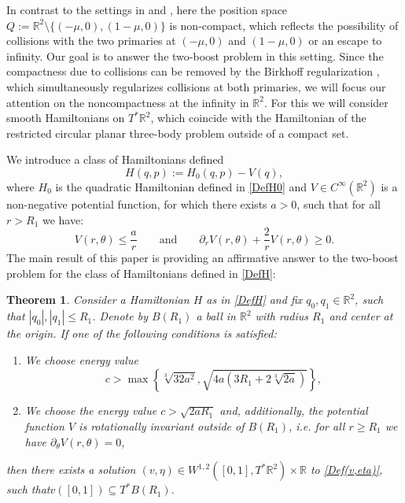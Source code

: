 \documentclass[a4paper]{amsart}
\newtheorem{thm}{Theorem}[section]
\numberwithin{equation}{section}
\newcommand{\R}{\mathbb{R}}
\begin{document}
In contrast to the settings in \cite{CieliebakFrauenfelder2009} and \cite{Merry2014}, here the position space\linebreak $Q:=\R^2\setminus\{(-\mu, 0), (1-\mu,0)\}$ is non-compact, which reflects the possibility of collisions with the two primaries at $(-\mu, 0)$ and $(1-\mu,0)$ or an escape to infinity. Our goal is to answer the two-boost problem in this setting. Since the compactness due to collisions can be removed by the Birkhoff regularization \cite{Birkhoff1915}, which simultaneously regularizes collisions at both primaries, we will focus our attention on the noncompactness at the infinity in $\R^2$. For this we will consider smooth Hamiltonians on $T^*\R^2$, which coincide with the Hamiltonian of the restricted circular planar three-body problem outside of a compact set. 

We introduce a class of Hamiltonians defined
\begin{equation}\label{DefH}
H(q,p):= H_0(q,p) - V(q),
\end{equation}
where $H_0$ is the quadratic Hamiltonian defined in \eqref{DefH0} and $V\in C^\infty(\R^2)$ is a non-negative potential function, for which there exists $a>0$, such that for all $r>R_1$ we have:
\begin{equation}\label{DefV}
V(r, \theta) \leq \frac{a}{r}\qquad\textrm{and}\qquad \partial_r V(r,\theta) +\frac{2}{r}V(r,\theta)\geq 0.
\end{equation}
The main result of this paper is providing an affirmative answer to the two-boost problem for the class of Hamiltonians defined in \eqref{DefH}:


\begin{thm} \label{thm:ExistenceOfChords}
Consider a Hamiltonian $H$ as in \eqref{DefH} and fix $q_0,q_1 \in \R^2$, such that $|q_0|,|q_1|\leq R_1$. Denote by $B(R_1)$ a ball in $\R^2$ with radius $R_1$ and center at the origin.
If one of the following conditions is satisfied:
\begin{enumerate}[label=\arabic*.]
\item We choose energy value
\begin{equation}\label{CondC}
c> \max\left\lbrace \sqrt[3]{32a^2}, \sqrt{4a\left(3 R_1+2\sqrt[3]{2a}\right)}\right\rbrace,
\end{equation}
\item We choose the energy value $c>\sqrt{2aR_1}$ and, additionally, the potential function $V$ is rotationally invariant outside of $B(R_1)$, i.e. for all $r\geq R_1$ we have $\partial_\theta V(r,\theta)=0$,
\end{enumerate}
then there exists a solution $(v,\eta)\in W^{1,2}([0,1], T^*\R^2)\times\R$ to \eqref{Def(v,eta)}, such that\linebreak $v([0,1])\subseteq T^*B(R_1)$.
\end{thm}
\end{document}
